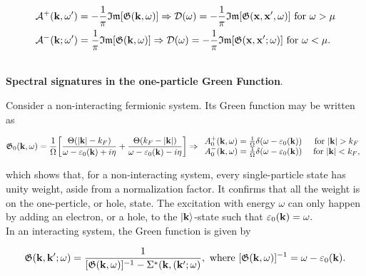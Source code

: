 \documentclass{homework}
\begin{document}
\begin{equation}
    \begin{split}
        &\mathcal{A}^{+}({\bf k}, \omega') = -\frac{1}{\pi} \mathfrak{I}\mathfrak{m}[\mathfrak{G}({\bf k}, \omega)] \Rightarrow \mathcal{D}(\omega) = -\frac{1}{\pi} \mathfrak{I}\mathfrak{m}[\mathfrak{G}({\bf x}, {\bf x}', \omega)]  \textnormal{ for } \omega > \mu  \\
        &\mathcal{A}^{-}({\bf k}; \omega') = \frac{1}{\pi} \mathfrak{I}\mathfrak{m}[\mathfrak{G}({\bf k}, \omega)] \Rightarrow \mathcal{D}(\omega) = -\frac{1}{\pi} \mathfrak{I}\mathfrak{m}[\mathfrak{G}({\bf x}, {\bf x}'; \omega)]  \textnormal{ for } \omega < \mu.
    \end{split}
\end{equation}

\blanky \\

\textbf{Spectral signatures in the one-particle Green Function}. 

Consider a non-interacting fermionic system. Its Green function may be written as 

\begin{equation}
    \mathfrak{G}_0({\bf k}, \omega) = \frac{1}{\Omega} \bigg[\frac{\Theta(|{\bf k}| - k_F)}{\omega - \varepsilon_0({\bf k}) + i \eta} + \frac{\Theta(k_F-|{\bf k}|)}{\omega - \varepsilon_0({\bf k}) - i \eta}\bigg] \Rightarrow \begin{array}{cc}
        A_0^+({\bf k}, \omega) = \frac{1}{\Omega} \delta(\omega - \varepsilon_0({\bf k})) & \textnormal{ for } |{\bf k}| > k_F \\
        A_0^-({\bf k}, \omega) = \frac{1}{\Omega} \delta(\omega - \varepsilon_0({\bf k})) & \textnormal{ for } |{\bf k}| < k_F,
    \end{array}
\end{equation}

which shows that, for a non-interacting system, every single-particle state has unity weight, aside from a normalization factor. It confirms that all the weight is on the one-perticle, or hole, state. The excitation with energy $\omega$ can only happen by adding an electron, or a hole, to the $\ket{{\bf k}}$-state such that $\varepsilon_0({\bf k}) = \omega.$ \\

In an interacting system, the Green function is given by 

\begin{equation}
    \mathfrak{G}({\bf k}, {\bf k}'; \omega) = \frac{1}{[\mathfrak{G}({\bf k}, \omega)]^{-1} - \Sigma^{*}({\bf k}, ({\bf k}'; \omega)}, \textnormal{ where } [\mathfrak{G}({\bf k}, \omega)]^{-1} = \omega - \varepsilon_0({\bf k}).
    \label{Feynmann_diags_spectral_functions}
\end{equation}
 
\end{document}
